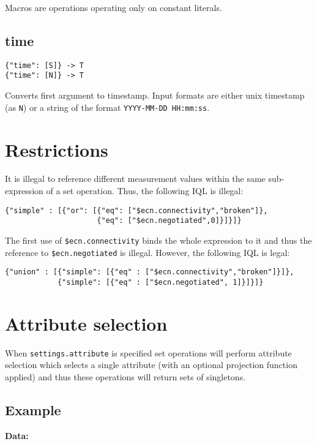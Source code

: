\documentclass[a4paper]{article}
\begin{document}
Macros are operations operating only on constant literals.

\subsection{time}

\begin{verbatim}
{"time": [S]} -> T
{"time": [N]} -> T
\end{verbatim}

Converts first argument to timestamp. Input formats are either unix timestamp (as \verb|N|) or a
string of the format \verb|YYYY-MM-DD HH:mm:ss|. 

\section{Restrictions}

It is illegal to reference different measurement values within the
same sub-expression of a set operation. Thus, the following IQL is
illegal:

\begin{verbatim}
{"simple" : [{"or": [{"eq": ["$ecn.connectivity","broken"]},
                     {"eq": ["$ecn.negotiated",0]}]}]}
\end{verbatim}

The first use of
\verb|$ecn.connectivity| binds the whole expression to it and thus the
reference to \verb|$ecn.negotiated| is illegal. However, the following
IQL is legal:

\begin{verbatim}
{"union" : [{"simple": [{"eq" : ["$ecn.connectivity","broken"]}]},
            {"simple": [{"eq" : ["$ecn.negotiated", 1]}]}]}
\end{verbatim}

\section{Attribute selection}

When \verb|settings.attribute| is specified set operations will
perform attribute selection which selects a single attribute (with an
optional projection function applied) and thus these operations will
return sets of singletons.

\subsection{Example}

\textbf{Data:}
\end{document}
